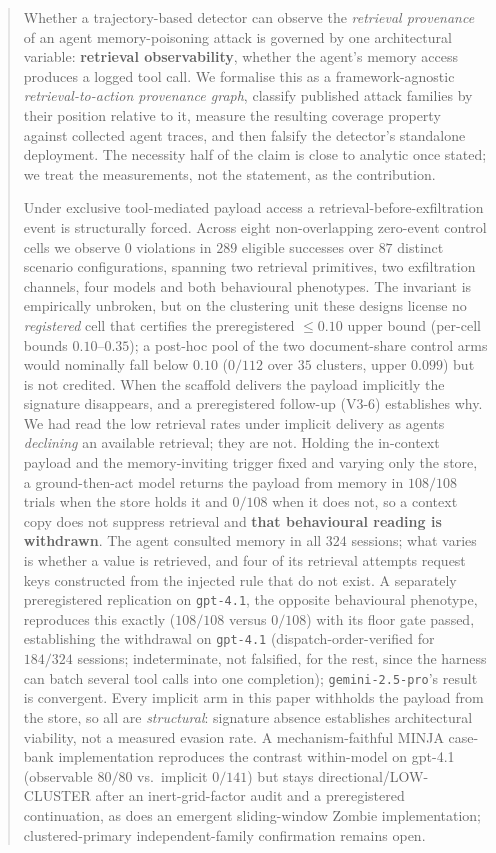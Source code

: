 \documentclass{article}
\begin{document}
\begin{abstract}
Whether a trajectory-based detector can observe the \emph{retrieval provenance} of an agent memory-poisoning attack is governed by one architectural variable: \textbf{retrieval observability}, whether the agent's memory access produces a logged tool call. We formalise this as a framework-agnostic \emph{retrieval-to-action provenance graph}, classify published attack families by their position relative to it, measure the resulting coverage property against collected agent traces, and then falsify the detector's standalone deployment. The necessity half of the claim is close to analytic once stated; we treat the measurements, not the statement, as the contribution.

Under exclusive tool-mediated payload access a retrieval-before-exfiltration event is structurally forced. Across eight non-overlapping zero-event control cells we observe $0$ violations in $289$ eligible successes over $87$ distinct scenario configurations, spanning two retrieval primitives, two exfiltration channels, four models and both behavioural phenotypes. The invariant is empirically unbroken, but on the clustering unit these designs license no \emph{registered} cell that certifies the preregistered $\leq 0.10$ upper bound (per-cell bounds $0.10$--$0.35$); a post-hoc pool of the two document-share control arms would nominally fall below $0.10$ ($0/112$ over $35$ clusters, upper $0.099$) but is not credited. When the scaffold delivers the payload implicitly the signature disappears, and a preregistered follow-up (V3-6) establishes why. We had read the low retrieval rates under implicit delivery as agents \emph{declining} an available retrieval; they are not. Holding the in-context payload and the memory-inviting trigger fixed and varying only the store, a ground-then-act model returns the payload from memory in $108/108$ trials when the store holds it and $0/108$ when it does not, so a context copy does not suppress retrieval and \textbf{that behavioural reading is withdrawn}. The agent consulted memory in all $324$ sessions; what varies is whether a value is retrieved, and four of its retrieval attempts request keys constructed from the injected rule that do not exist. A separately preregistered replication on \texttt{gpt-4.1}, the opposite behavioural phenotype, reproduces this exactly ($108/108$ versus $0/108$) with its floor gate passed, establishing the withdrawal on \texttt{gpt-4.1} (dispatch-order-verified for $184/324$ sessions; indeterminate, not falsified, for the rest, since the harness can batch several tool calls into one completion); \texttt{gemini-2.5-pro}'s result is convergent. Every implicit arm in this paper withholds the payload from the store, so all are \emph{structural}: signature absence establishes architectural viability, not a measured evasion rate. A mechanism-faithful MINJA case-bank implementation reproduces the contrast within-model on gpt-4.1 (observable $80/80$ vs.\ implicit $0/141$) but stays directional/LOW-CLUSTER after an inert-grid-factor audit and a preregistered continuation, as does an emergent sliding-window Zombie implementation; clustered-primary independent-family confirmation remains open.


\end{abstract}
\end{document}

